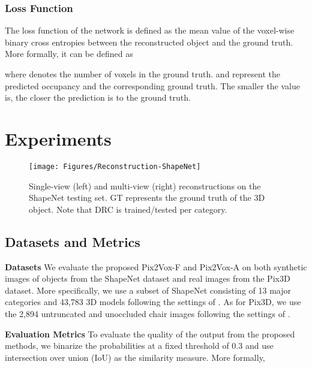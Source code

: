 \documentclass[10pt,twocolumn,letterpaper]{article}
\begin{document}
\vspace{-3 mm}
\subsubsection{Loss Function}
\vspace{-1 mm}

The loss function of the network is defined as the mean value of the voxel-wise binary cross entropies between the reconstructed object and the ground truth.
More formally, it can be defined as


where  denotes the number of voxels in the ground truth.  and  represent the predicted occupancy and the corresponding ground truth.
The smaller the  value is, the closer the prediction is to the ground truth.

\section{Experiments}

\begin{figure*}
  \centering
  \resizebox{\linewidth}{!} {
    \texttt{[image: Figures/Reconstruction-ShapeNet]}
  }
  \caption{Single-view (left) and multi-view (right) reconstructions on the ShapeNet testing set. GT represents the ground truth of the 3D object. Note that DRC \cite{DBLP:conf/cvpr/TulsianiZEM17} is trained/tested per category.}
  \label{fig:shapenet-reconstruction}
  \vspace{-2 mm}
\end{figure*}

\subsection{Datasets and Metrics}

\noindent \textbf{Datasets}
We evaluate the proposed Pix2Vox-F and Pix2Vox-A on both synthetic images of objects from the ShapeNet \cite{DBLP:conf/cvpr/WuSKYZTX15} dataset and real images from the Pix3D \cite{DBLP:conf/cvpr/Sun0ZZZXTF18} dataset.
More specifically, we use a subset of ShapeNet consisting of 13 major categories and 43,783 3D models following the settings of \cite{DBLP:conf/eccv/ChoyXGCS16}.
As for Pix3D, we use the 2,894 untruncated and unoccluded chair images following the settings of \cite{DBLP:conf/cvpr/Sun0ZZZXTF18}.

\noindent \textbf{Evaluation Metrics}
To evaluate the quality of the output from the proposed methods, we binarize the probabilities at a fixed threshold of 0.3 and use intersection over union (IoU) as the similarity measure.
More formally,
\end{document}
